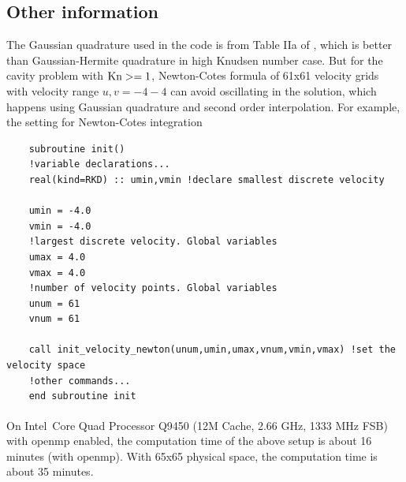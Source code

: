 \documentclass[a4paper]{book}
\begin{document}
\subsection{Other information}
The Gaussian quadrature used in the code is from Table IIa of \cite{Shizgal1981}, which is better than Gaussian-Hermite quadrature in high Knudsen number case. But for the cavity problem with ${\rm Kn}>=1$, Newton-Cotes formula of 61x61 velocity grids with velocity range $u,v=-4-4$ can avoid oscillating in the solution, which happens using Gaussian quadrature and second order interpolation. For example, the setting for Newton-Cotes integration

\begin{verbatim}
    subroutine init()
    !variable declarations...
    real(kind=RKD) :: umin,vmin !declare smallest discrete velocity

    umin = -4.0
    vmin = -4.0
    !largest discrete velocity. Global variables
    umax = 4.0
    vmax = 4.0
    !number of velocity points. Global variables
    unum = 61
    vnum = 61

    call init_velocity_newton(unum,umin,umax,vnum,vmin,vmax) !set the velocity space
    !other commands...
    end subroutine init
\end{verbatim}

On Intel\textregistered\ Core\textsuperscript{\texttrademark} Quad Processor Q9450 (12M Cache, 2.66 GHz, 1333 MHz FSB) with openmp enabled, the computation time of the above setup is about 16 minutes (with openmp). With 65x65 physical space, the computation time is about 35 minutes.

\backmatter

\end{document}
